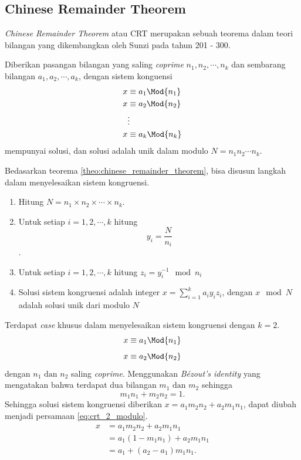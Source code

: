 \subsection{ Chinese Remainder Theorem}
\textit{Chinese Remainder Theorem} atau CRT merupakan sebuah teorema dalam teori bilangan yang dikembangkan oleh Sunzi pada tahun 201 - 300.
\begin{theo}
	\label{theo:chinese_remainder_theorem}
	Diberikan pasangan bilangan yang saling \textit{coprime} $n_1, n_2, \cdots, n_k$ dan sembarang bilangan $ a_1, a_2, \cdots, a_k $, dengan sistem konguensi 
	\begin{equation}
		\begin{aligned}
		x &\equiv a_1 \Mod{n_1}\\
		x &\equiv a_2 \Mod{n_2}\\
		& \vdots\\
		x &\equiv a_k \Mod{n_k}\\
		\end{aligned}
	\end{equation}
	mempunyai solusi, dan solusi adalah unik dalam modulo $ N = n_1n_2\cdots n_k$.
\end{theo}
Bedasarkan teorema \ref{theo:chinese_remainder_theorem}, bisa disusun langkah dalam menyelesaikan sistem kongruensi\cite{brilliant_crt}. 
\begin{enumerate}
	\item Hitung $ N = n_1 \times n_2 \times \cdots \times n_k$.
	\item Untuk setiap $ i = 1,2,\cdots,k $ hitung $$ y_i = \frac{N}{n_i} $$.
	\item Untuk setiap $ i = 1,2,\cdots,k $ hitung $ z_i = y_i^{-1} \mod{n_i} $
	\item Solusi sistem kongruensi adalah integer $ x = \sum_{i=1}^{k} a_i y_i z_i $, dengan $ x \mod{N} $ adalah solusi unik dari modulo $ N $
\end{enumerate}
Terdapat \textit{case} khusus dalam menyelesaikan sistem kongruensi dengan $ k = 2 $.
$$ x \equiv a_1 \Mod{n_1} $$
$$ x \equiv a_2 \Mod{n_2} $$
dengan $ n_1 \text{ dan } n_2 $ saling \textit{coprime}.
Menggunakan \textit{Bézout's identity} yang mengatakan bahwa terdapat dua bilangan $ m_1 \text{ dan } m_2 $ sehingga 
\begin{equation}
	m_1 n_1 + m_2 n_2 = 1.
	\label{eq:bezeout_identity}
\end{equation}
Sehingga solusi sistem kongruensi diberikan $ x = a_1 m_2 n_2 + a_2 m_1 n_1 $, dapat diubah menjadi persamaan \eqref{eq:crt_2_modulo}.
\begin{equation}
	\begin{aligned}
		x &= a_1 m_2 n_2 +a_2 m_1n_1 \\
		  &= a_1 (1-m_1 n_1) + a_2 m_1 n_1 \\
		  &= a_1 +( a_2-a_1) m_1 n_1.
	\end{aligned}
	\label{eq:crt_2_modulo}
\end{equation}

